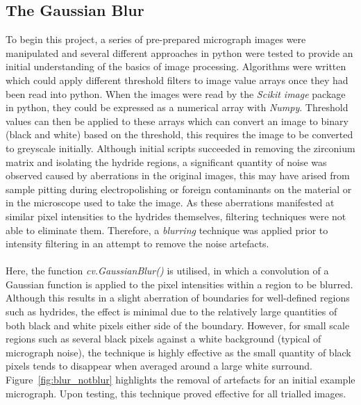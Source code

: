 \documentclass{article}
\begin{document}
	\subsection{The Gaussian Blur}
	To begin this project, a series of pre-prepared micrograph images were manipulated and several different approaches in python were tested to provide an initial understanding of the basics of image processing. Algorithms were written which could apply different threshold filters to image value arrays once they had been read into python. When the images were read by the \textit{Scikit image} package in python, they could be expressed as a numerical array with \textit{Numpy}. Threshold values can then be applied to these arrays which can convert an image to binary (black and white) based on the threshold, this requires the image to be converted to greyscale initially. 
	Although initial scripts succeeded in removing the zirconium matrix and isolating the hydride regions, a significant quantity of noise was observed caused by aberrations in the original images, this may have arised from sample pitting during electropolishing or foreign contaminants on the material or in the microscope used to take the image. As these aberrations manifested at similar pixel intensities to the hydrides themselves, filtering techniques were not able to eliminate them. Therefore, a \textit{blurring} technique was applied prior to intensity filtering in an attempt to remove the noise artefacts.
	\\
	\\
	Here, the function \textit{cv.GaussianBlur()} is utilised, in which a convolution of a Gaussian function is applied to the pixel intensities within a region to be blurred. Although this results in a slight aberration of boundaries for well-defined regions such as hydrides, the effect is minimal due to the relatively large quantities of both black and white pixels either side of the boundary. However, for small scale regions such as several black pixels against a white background (typical of micrograph noise), the technique is highly effective as the small quantity of black pixels tends to disappear when averaged around a large white surround. Figure~\ref{fig:blur_notblur} highlights the removal of artefacts for an initial example micrograph. Upon testing, this technique proved effective for all trialled images.
	\\
\end{document}
